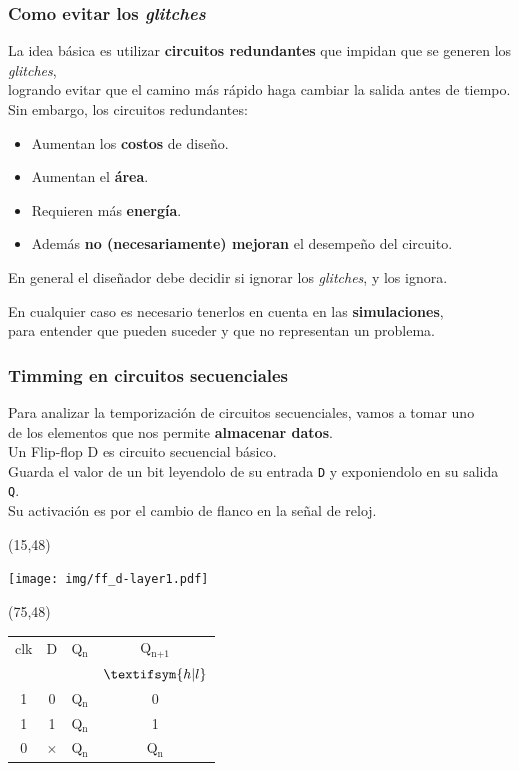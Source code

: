 \documentclass[aspectratio=169]{beamer}
\begin{document}
\begin{frame}[fragile,t]
    \frametitle{Como evitar los \emph{glitches}}
    La idea básica es utilizar \textcolor{naranjauca}{\textbf{circuitos redundantes}} que impidan que se generen los \emph{glitches},\\
    \textcolor{verdeuca}{logrando evitar que el camino más rápido haga cambiar la salida antes de tiempo.}\\
    \bigskip
    \pause
    Sin embargo, los circuitos redundantes:
    \begin{itemize}
    \item Aumentan los \textbf{costos} de diseño.
    \item Aumentan el \textbf{área}.
    \item Requieren más \textbf{energía}.
    \item Además \textbf{no (necesariamente) mejoran} el desempeño del circuito.
    \end{itemize}
    \bigskip
    \pause
    En general el diseñador debe decidir si ignorar los \emph{glitches}, \textcolor{naranjauca}{y los ignora.}
    \bigskip
    \begin{center}
    \textcolor{verdeuca}{
    En cualquier caso es necesario tenerlos en cuenta en las \textbf{simulaciones},\\
    para entender que pueden suceder y que no representan un problema.}
    \end{center}
\end{frame}

\begin{frame}[fragile,t]
    \frametitle{Timming en circuitos secuenciales}
    Para analizar la temporización de circuitos secuenciales, vamos a tomar uno\\ de los elementos que nos permite \textbf{almacenar datos}.\\
    \bigskip
    \textcolor{verdeuca}{Un Flip-flop D es circuito secuencial básico.\\
    Guarda el valor de un bit leyendolo de su entrada \texttt{D} y exponiendolo en su salida \texttt{Q}.\\
    Su activación es por el cambio de flanco en la señal de reloj.\\}
    \begin{textblock}{65}(15,48)
    \begin{center}
    \texttt{[image: img/ff\_d-layer1.pdf]}
    \end{center}
    \end{textblock}
    \begin{textblock}{65}(75,48)
    \begin{tabular}{c|c|c||c}
    clk & D & Q$_\text{n}$ & Q$_\text{n+1}$ \\
       &   &              & $\textifsym{h|l}$ \\ \hline
    1  & 0 & Q$_\text{n}$ & 0 \\
    1  & 1 & Q$_\text{n}$ & 1 \\
    0  & $\times$ & Q$_\text{n}$ & Q$_\text{n}$ \\  
    \end{tabular}
    \end{textblock}
\end{frame}
\end{document}

